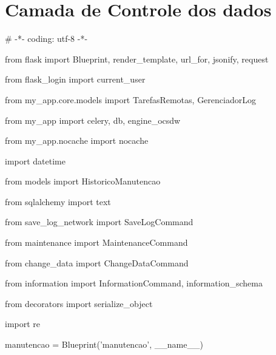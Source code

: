 \chapter{Camada de Controle dos dados}
\label{ane:dois}

{\ttfamily\color[rgb]{0.10980392,0.10980392,0.10980392}
    \# -*- coding: utf-8 -*-}


    \bigskip

{\ttfamily\color[rgb]{0.10980392,0.10980392,0.10980392}
    from flask import Blueprint, render\_template, url\_for, jsonify, request}

{\ttfamily\color[rgb]{0.10980392,0.10980392,0.10980392}
    from flask\_login import current\_user}

{\ttfamily\color[rgb]{0.10980392,0.10980392,0.10980392}
    from my\_app.core.models import TarefasRemotas, GerenciadorLog}

{\ttfamily\color[rgb]{0.10980392,0.10980392,0.10980392}
    from my\_app import celery, db, engine\_ocsdw}

{\ttfamily\color[rgb]{0.10980392,0.10980392,0.10980392}
    from my\_app.nocache import nocache}

{\ttfamily\color[rgb]{0.10980392,0.10980392,0.10980392}
    import datetime}

{\ttfamily\color[rgb]{0.10980392,0.10980392,0.10980392}
    from models import HistoricoManutencao}

{\ttfamily\color[rgb]{0.10980392,0.10980392,0.10980392}
    from sqlalchemy import text}

{\ttfamily\color[rgb]{0.10980392,0.10980392,0.10980392}
    from save\_log\_network import SaveLogCommand}

{\ttfamily\color[rgb]{0.10980392,0.10980392,0.10980392}
    from maintenance import MaintenanceCommand}

{\ttfamily\color[rgb]{0.10980392,0.10980392,0.10980392}
    from change\_data import ChangeDataCommand}

{\ttfamily\color[rgb]{0.10980392,0.10980392,0.10980392}
    from information import InformationCommand, information\_schema}

{\ttfamily\color[rgb]{0.10980392,0.10980392,0.10980392}
    from decorators import serialize\_object}

{\ttfamily\color[rgb]{0.10980392,0.10980392,0.10980392}
    import re}


    \bigskip

{\ttfamily\color[rgb]{0.10980392,0.10980392,0.10980392}
    manutencao = Blueprint('manutencao', \_\_name\_\_)}


